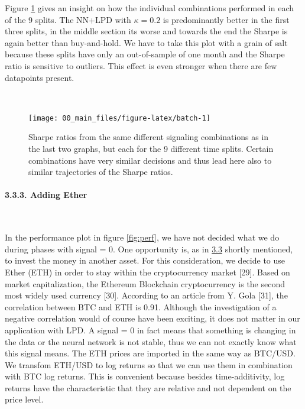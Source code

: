 \documentclass[
]{article}
\begin{document}
Figure \ref{fig:batch} gives an insight on how the individual
combinations performed in each of the 9 splits. The NN+LPD with
\(\kappa = 0.2\) is predominantly better in the first three splits, in
the middle section its worse and towards the end the Sharpe is again
better than buy-and-hold. We have to take this plot with a grain of salt
because these splits have only an out-of-sample of one month and the
Sharpe ratio is sensitive to outliers. This effect is even stronger when
there are few datapoints present.

~

\begin{figure}

{\centering \texttt{[image: 00\_main\_files/figure-latex/batch-1]} 

}

\caption{Sharpe ratios from the same different signaling combinations as in the last two graphs, but each for the 9 different time splits. Certain combinations have very similar decisions and thus lead here also to similar trajectories of the Sharpe ratios.}\label{fig:batch}
\end{figure}

\newpage

\hypertarget{adding-ether}{%
\paragraph{3.3.3. Adding Ether}\label{adding-ether}}

~

In the performance plot in figure \ref{fig:perf}, we have not decided
what we do during phases with signal = 0. One opportunity is, as in
\protect\hyperlink{trading-strat}{3.3} shortly mentioned, to invest the
money in another asset. For this consideration, we decide to use Ether
(ETH) in order to stay within the cryptocurrency market {[}29{]}. Based
on market capitalization, the Ethereum Blockchain cryptocurrency is the
second most widely used currency {[}30{]}. According to an article from
Y. Gola {[}31{]}, the correlation between BTC and ETH is 0.91. Although
the investigation of a negative correlation would of course have been
exciting, it does not matter in our application with LPD. A signal = 0
in fact means that something is changing in the data or the neural
network is not stable, thus we can not exactly know what this signal
means. The ETH prices are imported in the same way as BTC/USD. We
transfom ETH/USD to log returns so that we can use them in combination
with BTC log returns. This is convenient because besides
time-additivity, log returns have the characteristic that they are
relative and not dependent on the price level.
\end{document}
